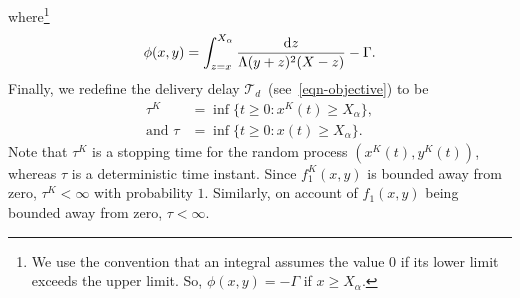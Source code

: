 \documentclass[10pt,journal,letterpaper]{IEEEtran}
\begin{document}
where\footnote{We use the convention that an integral assumes the value $0$
if its lower limit exceeds the upper limit. So, $\phi(x,y) = -\Gamma$ if $x \geq X_{\alpha}$.}
\begin{equation}
\label{eqn:phi}
 \phi(x,y) = \int_{z = x}^{X_{\alpha}}\frac{{\rm d}z}{\Lambda(y + z)^2(X - z)} - \Gamma.
\end{equation}
Finally, we redefine the delivery delay $\mathcal{T}_d$~(see~\eqref{eqn-objective}) to be
\begin{align}
\tau^K &= \inf\{t \geq 0: x^K(t) \geq X_{\alpha}\},\label{eqn:tau-K} \\
\mbox{and }\tau &= \inf\{t \geq 0: x(t) \geq X_{\alpha}\}. \label{eqn:stop-dstns}
\end{align}
 Note that $\tau^K$ is a stopping time for the random
process $(x^K(t),y^K(t))$, whereas $\tau$ is a deterministic time instant. Since $f^K_1(x,y)$ is bounded away from
zero, $\tau^K < \infty$ with probability $1$. Similarly, on account of $f_1(x,y)$ being bounded away from
zero, $\tau < \infty$.
\end{document}
